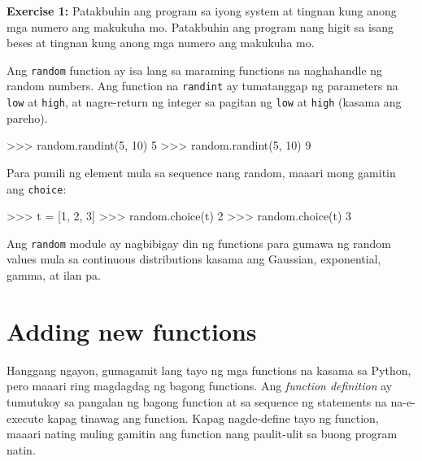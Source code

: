 \documentclass[10pt,]{book}
\newenvironment{Shaded}{}{}
\newcommand{\DecValTok}[1]{\textcolor[rgb]{0.25,0.63,0.44}{#1}}
\newcommand{\NormalTok}[1]{#1}
\newcommand{\OperatorTok}[1]{\textcolor[rgb]{0.40,0.40,0.40}{#1}}
\begin{document}
\textbf{Exercise 1:} Patakbuhin ang program sa iyong system at tingnan
kung anong mga numero ang makukuha mo. Patakbuhin ang program nang higit
sa isang beses at tingnan kung anong mga numero ang makukuha mo.

Ang \texttt{random} function ay isa lang sa maraming functions na
naghahandle ng random numbers. Ang function na \texttt{randint} ay
tumatanggap ng parameters na \texttt{low} at \texttt{high}, at
nagre-return ng integer sa pagitan ng \texttt{low} at \texttt{high}
(kasama ang pareho).

 

\begin{Shaded}
\begin{Highlighting}[]
\OperatorTok{\textgreater{}\textgreater{}\textgreater{}}\NormalTok{ random.randint(}\DecValTok{5}\NormalTok{, }\DecValTok{10}\NormalTok{)}
\DecValTok{5}
\OperatorTok{\textgreater{}\textgreater{}\textgreater{}}\NormalTok{ random.randint(}\DecValTok{5}\NormalTok{, }\DecValTok{10}\NormalTok{)}
\DecValTok{9}
\end{Highlighting}
\end{Shaded}

Para pumili ng element mula sa sequence nang random, maaari mong gamitin
ang \texttt{choice}:

 

\begin{Shaded}
\begin{Highlighting}[]
\OperatorTok{\textgreater{}\textgreater{}\textgreater{}}\NormalTok{ t }\OperatorTok{=}\NormalTok{ [}\DecValTok{1}\NormalTok{, }\DecValTok{2}\NormalTok{, }\DecValTok{3}\NormalTok{]}
\OperatorTok{\textgreater{}\textgreater{}\textgreater{}}\NormalTok{ random.choice(t)}
\DecValTok{2}
\OperatorTok{\textgreater{}\textgreater{}\textgreater{}}\NormalTok{ random.choice(t)}
\DecValTok{3}
\end{Highlighting}
\end{Shaded}

Ang \texttt{random} module ay nagbibigay din ng functions para gumawa ng
random values mula sa continuous distributions kasama ang Gaussian,
exponential, gamma, at ilan pa.

\section{Adding new functions}\label{adding-new-functions}

Hanggang ngayon, gumagamit lang tayo ng mga functions na kasama sa
Python, pero maaari ring magdagdag ng bagong functions. Ang
\emph{function definition} ay tumutukoy sa pangalan ng bagong function
at sa sequence ng statements na na-e-execute kapag tinawag ang function.
Kapag nagde-define tayo ng function, maaari nating muling gamitin ang
function nang paulit-ulit sa buong program natin.
\end{document}
